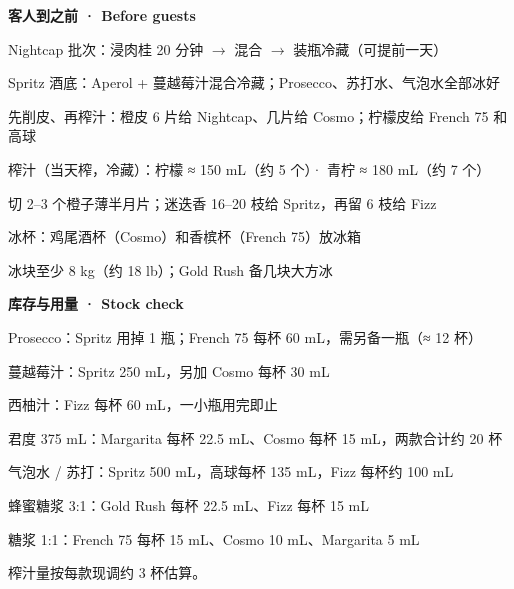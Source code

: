 \documentclass{cocktailcheatsheet}
\begin{document}

\begin{tcolorbox}[cms panel, after skip=0pt]
\begin{minipage}[t]{0.5\linewidth}
  {\fontsize{9.5}{12}\selectfont\color{menuaccent}\bfseries 客人到之前 · Before guests\par}
  \begin{checklist}
    \item Nightcap 批次：浸肉桂 20 分钟 $\rightarrow$ 混合 $\rightarrow$ 装瓶冷藏（可提前一天）
    \item Spritz 酒底：Aperol + 蔓越莓汁混合冷藏；Prosecco、苏打水、气泡水全部冰好
    \item 先削皮、再榨汁：橙皮 6 片给 Nightcap、几片给 Cosmo；柠檬皮给 French 75 和高球
    \item 榨汁（当天榨，冷藏）：柠檬 ≈ 150 mL（约 5 个）· 青柠 ≈ 180 mL（约 7 个）
    \item 切 2–3 个橙子薄半月片；迷迭香 16–20 枝给 Spritz，再留 6 枝给 Fizz
    \item 冰杯：鸡尾酒杯（Cosmo）和香槟杯（French 75）放冰箱
    \item 冰块至少 8 kg（约 18 lb）；Gold Rush 备几块大方冰
  \end{checklist}
\end{minipage}\hfill
\begin{minipage}[t]{0.46\linewidth}
  {\fontsize{9.5}{12}\selectfont\color{menuaccent}\bfseries 库存与用量 · Stock check\par}
  \begin{checklist}
    \item Prosecco：Spritz 用掉 1 瓶；French 75 每杯 60 mL，需另备一瓶（≈ 12 杯）
    \item 蔓越莓汁：Spritz 250 mL，另加 Cosmo 每杯 30 mL
    \item 西柚汁：Fizz 每杯 60 mL，一小瓶用完即止
    \item 君度 375 mL：Margarita 每杯 22.5 mL、Cosmo 每杯 15 mL，两款合计约 20 杯
    \item 气泡水 / 苏打：Spritz 500 mL，高球每杯 135 mL，Fizz 每杯约 100 mL
    \item 蜂蜜糖浆 3:1：Gold Rush 每杯 22.5 mL、Fizz 每杯 15 mL
    \item 糖浆 1:1：French 75 每杯 15 mL、Cosmo 10 mL、Margarita 5 mL
  \end{checklist}
  \vspace{3pt}
  {\fontsize{7.6}{9.5}\selectfont\color{menuink!60}榨汁量按每款现调约 3 杯估算。\par}
\end{minipage}
\end{tcolorbox}
\end{document}

